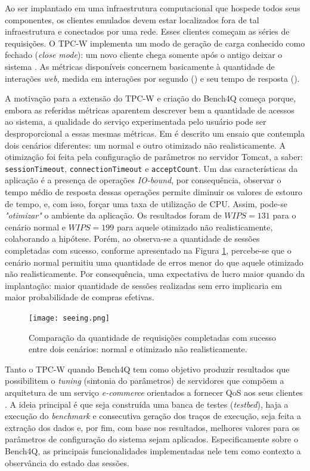 Ao ser implantado em uma infraestrutura computacional que hospede todos seus componentes, os clientes emulados devem estar localizados fora de tal infraestrutura e conectados por uma rede. Esses clientes começam as séries de requisições. O TPC-W implementa um modo de geração de carga conhecido como fechado (\textit{close mode}): um novo cliente chega somente após o antigo deixar o sistema \cite{Zhang2011}. As métricas disponíveis concernem basicamente à quantidade de interações \textit{web}, medida em interações por segundo () e seu tempo de resposta ().

A motivação para a extensão do TPC-W e criação do Bench4Q começa porque, embora as referidas métricas aparentem descrever bem a quantidade de acessos ao sistema, a qualidade do serviço experimentada pelo usuário pode ser desproporcional a essas mesmas métricas. Em  é descrito um ensaio que contempla dois cenários diferentes: um normal e outro otimizado não realisticamente. A otimização foi feita pela configuração de parâmetros no servidor Tomcat, a saber: \texttt{sessionTimeout}, \texttt{connectionTimeout} e \texttt{acceptCount}. Um das características da aplicação é a presença de operações \textit{ IO-bound}, por consequência, observar o tempo médio de resposta dessas operações permite diminuir os valores de estouro de tempo, e, com isso, forçar uma taxa de utilização de CPU. Assim, pode-se \textit{"otimizar"} o ambiente da aplicação. Os resultados foram de $WIPS = 131$ para o cenário normal e $WIPS=199$ para aquele otimizado não realisticamente, colaborando a hipótese. Porém, ao observa-se a quantidade de sessões completadas com sucesso, conforme apresentado na Figura \ref{fig:seeing}, percebe-se que o cenário normal permitiu uma quantidade de erros menor do que aquele otimizado não realisticamente. Por consequência, uma expectativa de lucro maior quando da implantação: maior quantidade de sessões realizadas sem erro implicaria em maior probabilidade de compras efetivas.

\begin{figure}[htb]
	\centering
	\texttt{[image: seeing.png]}
	\caption{Comparação da quantidade de requisições completadas com sucesso entre dois cenários: normal e otimizado não realisticamente.}
	\label{fig:seeing}
\end{figure}


Tanto o TPC-W quando Bench4Q tem como objetivo produzir resultados que possibilitem o \textit{tuning} (sintonia do parâmetros) de servidores que compõem a arquitetura de um serviço \textit{e-commerce} orientados a fornecer QoS aos seus clientes \cite{Menasce2002, Zhang2011}.  A ideia principal é que seja construída uma banca de testes (\textit{testbed}), haja a execução do \textit{benchmark} e consecutiva geração dos traços de execução, seja feita a extração dos dados e, por fim, com base nos resultados, melhores valores para os parâmetros de configuração do sistema sejam aplicados. Especificamente sobre o Bench4Q, as principais funcionalidades implementadas nele tem como contexto a observância do estado das sessões.

